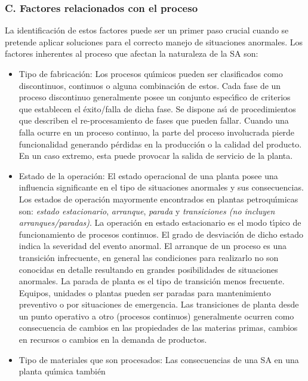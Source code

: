 \subsubsection{C. Factores relacionados con el proceso}
La identificaci{\'o}n de estos factores puede ser un primer paso crucial cuando se pretende aplicar soluciones
para el correcto manejo de situaciones anormales. Los factores inherentes al proceso que afectan la
naturaleza de la SA son:
\begin{itemize}
    \item Tipo de fabricaci{\'o}n: Los procesos qu{\'\i}micos pueden ser clasificados como discontinuos, continuos o
    alguna combinaci{\'o}n de estos. Cada fase de un proceso discontinuo generalmente posee un conjunto
    espec{\'\i}fico de criterios que establecen el {\'e}xito/falla de dicha fase. Se dispone as{\'\i} de procedimientos que
    describen el re-procesamiento de fases que pueden fallar. Cuando una falla ocurre en un proceso
    continuo, la parte del proceso involucrada pierde funcionalidad generando p{\'e}rdidas en la producci{\'o}n o
    la calidad del producto. En un caso extremo, esta puede provocar la salida de servicio de la planta.
    \item Estado de la operaci{\'o}n: El estado operacional de una planta posee una influencia significante en el
    tipo de situaciones anormales y sus consecuencias. Los estados de operaci{\'o}n mayormente encontrados en
    plantas petroqu{\'\i}micas son: \textit{estado estacionario}, \textit{arranque}, \textit{parada} y \textit{transiciones (no incluyen
    arranques/paradas)}. La operaci{\'o}n en estado estacionario es el modo t{\'\i}pico de funcionamiento de procesos
    continuos. El grado de desviaci{\'o}n de dicho estado indica la severidad del evento anormal. El arranque de
    un proceso es una transici{\'o}n infrecuente, en general las condiciones para realizarlo no son conocidas en
    detalle resultando en grandes posibilidades de situaciones anormales. La parada de planta es el tipo de
    transici{\'o}n menos frecuente. Equipos, unidades o plantas pueden ser paradas para mantenimiento preventivo
    o por situaciones de emergencia. Las transiciones de planta desde un punto operativo a otro (procesos
    continuos) generalmente ocurren como consecuencia de cambios en las propiedades de las materias primas,
    cambios en recursos o cambios en la demanda de productos.
    \item Tipo de materiales que son procesados: Las consecuencias de una SA en una planta qu{\'\i}mica tambi{\'e}n

\end{itemize}
